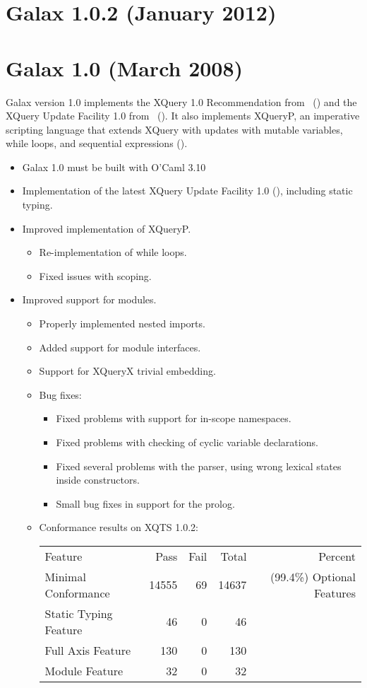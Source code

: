 \section{Galax 1.0.2 (January 2012)}

\section{Galax 1.0 (March 2008)}

Galax version 1.0 implements the XQuery 1.0 Recommendation from
\xqueryrec\ (\xqueryurl) and the XQuery Update Facility 1.0 from
\ultfwd\ (\ultfurl).  It also implements XQueryP, an imperative
scripting language that extends XQuery with updates with mutable
variables, while loops, and sequential expressions (\xqueryp).

\begin{itemize}
\item Galax 1.0 must be built with O'Caml 3.10
\item Implementation of the latest XQuery Update Facility 1.0
(\ultfurl), including static typing.
\item Improved implementation of XQueryP.
\begin{itemize}
      \item Re-implementation of while loops.
      \item Fixed issues with scoping.
\end{itemize}
\item Improved support for modules.
\begin{itemize}
      \item Properly implemented nested imports.
      \item Added support for module interfaces.
\item Support for XQueryX trivial embedding.
\item Bug fixes:
\begin{itemize}
      \item Fixed problems with support for in-scope namespaces.
      \item Fixed problems with checking of cyclic variable declarations.
      \item Fixed several problems with the parser, using wrong lexical states inside constructors.
      \item Small bug fixes in support for the prolog.
\end{itemize}
\item Conformance results on XQTS 1.0.2:
\begin{tabular}{lrrrr}
  Feature & Pass & Fail & Total & Percent\\
  Minimal Conformance      &       14555 & 69 & 14637 & (99.4\%)
  Optional Features \\
    Static Typing Feature   &      46    & 0   & 46 \\
    Full Axis Feature        &     130  & 0   & 130\\
    Module Feature            &    32    & 0   & 32\\
\end{tabular}
\end{itemize}
\end{itemize}

